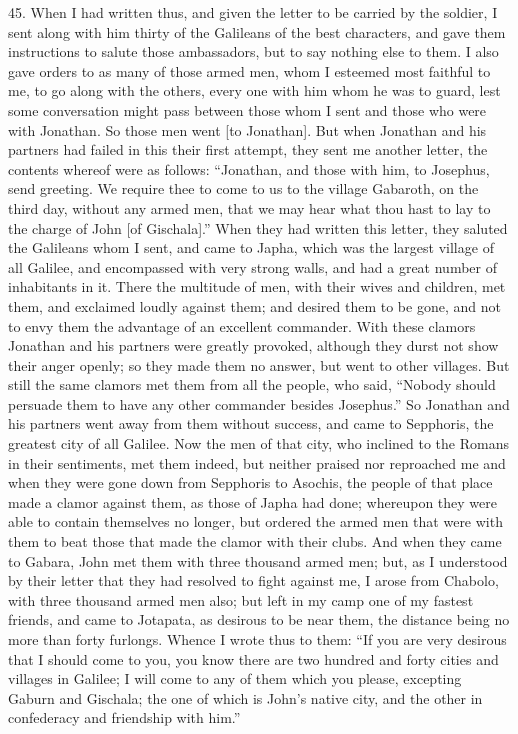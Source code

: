45. When I had written thus, and given the letter to be carried by the
soldier, I sent along with him thirty of the Galileans of the best
characters, and gave them instructions to salute those ambassadors, but to
say nothing else to them. I also gave orders to as many of those armed
men, whom I esteemed most faithful to me, to go along with the others,
every one with him whom he was to guard, lest some conversation might pass
between those whom I sent and those who were with Jonathan. So those men
went [to Jonathan]. But when Jonathan and his partners had failed in this
their first attempt, they sent me another letter, the contents whereof
were as follows: ``Jonathan, and those with him, to Josephus, send
greeting. We require thee to come to us to the village Gabaroth, on the
third day, without any armed men, that we may hear what thou hast to lay
to the charge of John [of Gischala].'' When they had written this letter,
they saluted the Galileans whom I sent, and came to Japha, which was the
largest village of all Galilee, and encompassed with very strong walls,
and had a great number of inhabitants in it. There the multitude of men,
with their wives and children, met them, and exclaimed loudly against
them; and desired them to be gone, and not to envy them the advantage of
an excellent commander. With these clamors Jonathan and his partners were
greatly provoked, although they durst not show their anger openly; so they
made them no answer, but went to other villages. But still the same
clamors met them from all the people, who said, ``Nobody should persuade
them to have any other commander besides Josephus.'' So Jonathan and his
partners went away from them without success, and came to Sepphoris, the
greatest city of all Galilee. Now the men of that city, who inclined to
the Romans in their sentiments, met them indeed, but neither praised nor
reproached me and when they were gone down from Sepphoris to Asochis, the
people of that place made a clamor against them, as those of Japha had
done; whereupon they were able to contain themselves no longer, but
ordered the armed men that were with them to beat those that made the
clamor with their clubs. And when they came to Gabara, John met them with
three thousand armed men; but, as I understood by their letter that they
had resolved to fight against me, I arose from Chabolo, with three
thousand armed men also; but left in my camp one of my fastest friends,
and came to Jotapata, as desirous to be near them, the distance being no
more than forty furlongs. Whence I wrote thus to them: ``If you are very
desirous that I should come to you, you know there are two hundred and
forty cities and villages in Galilee; I will come to any of them which you
please, excepting Gaburn and Gischala; the one of which is John's native
city, and the other in confederacy and friendship with him.''

